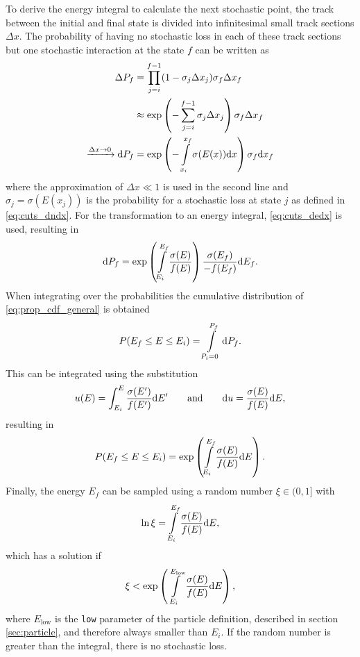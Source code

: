 To derive the energy integral to calculate the next stochastic point, the track between the initial and final state is divided into infinitesimal small track sections $\Delta x$.
The probability of having no stochastic loss in each of these track sections but one stochastic interaction at the state $f$ can be written as
\begin{align}
    \Delta P_f &= \prod\limits_{j=i}^{f-1} (1 - \sigma_j \Delta x_j) \sigma_f \Delta x_f \\
        &\approx \exp \left( - \sum\limits_{j=i}^{f-1} \sigma_j \Delta x_j \right) \sigma_f \Delta x_f \\
    \xrightarrow{\Delta x \to 0} \mathrm{d} P_f &= \exp \left( - \int\limits_{x_i}^{x_f} \sigma(E(x)) \mathrm{d} x \right) \sigma_f \mathrm{d} x_f \label{eq:prop_interaction_integral}
\end{align}
where the approximation of $\Delta x \ll 1$ is used in the second line and $\sigma_j = \sigma(E(x_j))$ is the probability for a stochastic loss at state $j$ as defined in \eqref{eq:cuts_dndx}.
For the transformation to an energy integral, \eqref{eq:cuts_dedx} is used, resulting in
\begin{align}
    \mathrm{d} P_f = \exp \left( \int\limits_{E_i}^{E_f} \frac{\sigma(E)}{f(E)} \right) \frac{\sigma(E_f)}{-f(E_f)} \mathrm{d} E_f .
\end{align}
When integrating over the probabilities the cumulative distribution of \eqref{eq:prop_cdf_general} is obtained
\begin{align}
    P(E_f \leq E \leq E_i) = \int\limits_{P_i=0}^{P_f} \mathrm{d} P_f .
\end{align}
This can be integrated using the substitution
\begin{align}
    u(E) = \int_{E_i}^E \frac{\sigma(E')}{f(E')} \mathrm{d} E'
    \qquad \text{and} \qquad
    \mathrm{d} u = \frac{\sigma(E)}{f(E)} \mathrm{d} E ,
\end{align}
resulting in
\begin{align}
    P(E_f \leq E \leq E_i) = \exp \left( \int\limits_{E_i}^{E_f} \frac{\sigma(E)}{f(E)} \mathrm{d} E \right) .
\end{align}
Finally, the energy $E_f$ can be sampled using a random number $\xi \in (0,1]$ with
\begin{align} \label{eq:energy_integral_int}
    \operatorname{ln} \xi = \int\limits_{E_i}^{E_f} \frac{\sigma(E)}{f(E)} \mathrm{d} E ,
\end{align}
which has a solution if
\begin{align}
    \xi < \exp \left( \int\limits_{E_i}^{E_{\text{low}}} \frac{\sigma(E)}{f(E)} \mathrm{d} E \right) ,
\end{align}
where $E_{\text{low}}$ is the \texttt{low} parameter of the particle definition, described in section \ref{sec:particle}, and therefore always smaller than $E_i$.
If the random number is greater than the integral, there is no stochastic loss.

